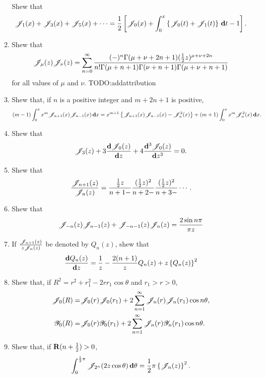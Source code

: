 \documentclass{book}
\begin{document}
\begin{enumerate}
  Shew that
  $$
  \mathscr{J}_{1}(x)
  +
  \mathscr{J}_{3}(x)
  +
  \mathscr{J}_{5}(x)
  +
  \cdots
  =
  \frac{1}{2}
  \left[ 
    \mathscr{J}_{0}(x)
    +
    \int_{0}^{x}
    \left\{ 
      \mathscr{J}_{0}(t) + \mathscr{J}_{1}(t)
     \right\}
    \, \mathbf{d} t
    -
    1
     \right].
  $$
\item
  Shew that
  $$
  \mathscr{J}_{\mu}(z) \mathscr{J}_{\nu}(z)
  =
  \sum_{n=0}^{\infty}
  \frac{(-)^{n} \Gamma(\mu+\nu+2n+1) (\frac{1}{2} z)^{\mu+\nu+2n}}{
    n! \Gamma(\mu+n+1) \Gamma(\nu+n+1) \Gamma(\mu+\nu+n+1)}
  $$
  for all values of $\mu$ and $\nu$.
  TODO:addattribution
\item
  Shew that, if $n$ is a positive integer and $m+2n+1$ is positive,
  $$
  (m-1)
  \int_{0}^{x}
  x^{m} \mathscr{J}_{n+1}(x) \mathscr{J}_{n-1}(x)
  \, \mathbf{d} x
  =
  x^{m+1}
  \left\{ 
    \mathscr{J}_{n+1}(x)\mathscr{J}_{n-1}(x) - \mathscr{J}_{n}^{2}(x)
   \right\}
  +
  (m+1)
  \int_{0}^{x} x^{m} \mathscr{J}_{n}^{2}(x)
  \, \mathbf{d} x.
  $$
\item
  Shew that
  $$
  \mathscr{J}_{3}(z)
  +
  3 \frac{\mathbf{d} \mathscr{J}_{0}(z)}{\mathbf{d} z}
  +
  4 \frac{\mathbf{d}^{3} \mathscr{J}_{0}(z)}{\mathbf{d} z^{3}}
  =
  0.
  $$
\item
  Shew that
  $$
  \frac{\mathscr{J}_{n+1}(z)}{\mathscr{J}_{n}(z)}
  =
  \frac{ \frac{1}{2} z }{n+1-}
  \frac{ (\frac{1}{2} z)^{2} }{n+2-}
  \frac{ (\frac{1}{2} z)^{2} }{n+3-}
  \cdots.
  $$
\item
  Shew that
  $$
  \mathscr{J}_{-n}(z) \mathscr{J}_{n-1}(z)
  +
  \mathscr{J}_{-n-1}(z) \mathscr{J}_{n}(z)
  =
  \frac{2 \sin n\pi}{\pi z}
  $$
\item
  If $\frac{\mathscr{J}_{n+1}(z)}{z \mathscr{J}_{n}(z)}$ be denoted by $Q_{n}(z)$,
  shew that
  $$
  \frac{ \mathbf{d} Q_{n}(z) }{\mathbf{d} z}
  =
  \frac{1}{z}
  -
  \frac{2(n+1)}{z}
  Q_{n}(z)
  +
  z \left\{  Q_{n}(z)  \right\}^{2}
  $$
\item
  Shew that, if
  $R^{2} = r^{2} + r_{1}^{2} - 2rr_{1}\cos\theta$
  and
  $r_{1} > r > 0$,
  \begin{align*}
    \mathscr{J}_{0}(R)
    =&
    \mathscr{J}_{0}(r) \mathscr{J}_{0}(r_{1})
    +
    2 \sum_{n=1}^{\infty} \mathscr{J}_{n}(r) \mathscr{J}_{n}(r_{1}) \cos n\theta,
    \\
    \mathscr{Y}_{0}(R)
    =&
    \mathscr{J}_{0}(r) \mathscr{Y}_{0}(r_{1})
    +
    2 \sum_{n=1}^{\infty} \mathscr{J}_{n}(r) \mathscr{Y}_{n}(r_{1}) \cos n\theta.
  \end{align*}
\item
  Shew that, if $\operatorname{\mathbf{R}}(n+\frac{1}{2}) > 0$,
  $$
  \int_{0}^{\frac{1}{2}\pi}
  \mathscr{J}_{2^{n}}(2z\cos\theta) \, \mathbf{d} \theta
  =
  \frac{1}{2}\pi \left\{  \mathscr{J}_{n}(z)  \right\}^{2}.
$$
\end{enumerate}
\end{document}
